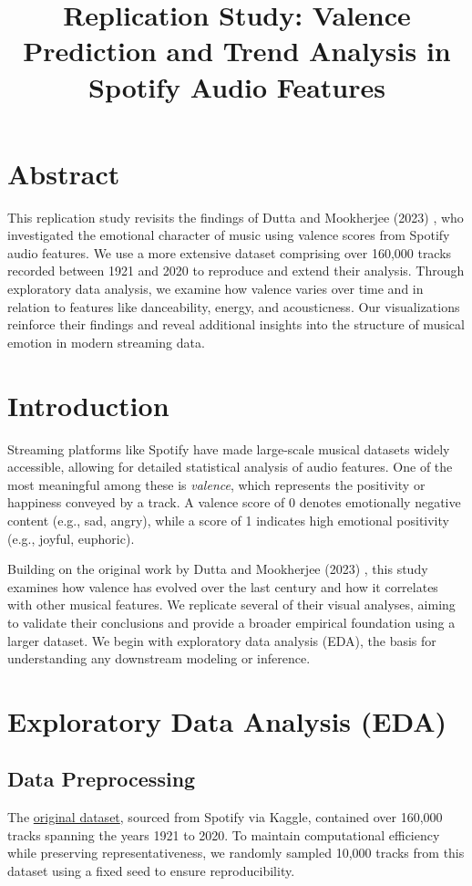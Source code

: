 \documentclass[a4paper,11pt]{article}
\title{Replication Study: Valence Prediction and Trend Analysis in Spotify Audio Features}
\author{}
\date{}
\begin{document}
\maketitle

\section*{Abstract}
This replication study revisits the findings of Dutta and Mookherjee (2023) \citep{dutta2023emotional}, who investigated the emotional character of music using valence scores from Spotify audio features. We use a more extensive dataset comprising over 160,000 tracks recorded between 1921 and 2020 to reproduce and extend their analysis. Through exploratory data analysis, we examine how valence varies over time and in relation to features like danceability, energy, and acousticness. Our visualizations reinforce their findings and reveal additional insights into the structure of musical emotion in modern streaming data.

\section{Introduction}
Streaming platforms like Spotify have made large-scale musical datasets widely accessible, allowing for detailed statistical analysis of audio features. One of the most meaningful among these is \textit{valence}, which represents the positivity or happiness conveyed by a track. A valence score of 0 denotes emotionally negative content (e.g., sad, angry), while a score of 1 indicates high emotional positivity (e.g., joyful, euphoric).

Building on the original work by Dutta and Mookherjee (2023) \citep{dutta2023emotional}, this study examines how valence has evolved over the last century and how it correlates with other musical features. We replicate several of their visual analyses, aiming to validate their conclusions and provide a broader empirical foundation using a larger dataset. We begin with exploratory data analysis (EDA), the basis for understanding any downstream modeling or inference.

\section{Exploratory Data Analysis (EDA)}

\subsection{Data Preprocessing}
The \href{https://www.kaggle.com/datasets/yamaerenay/spotify-dataset-1921-2020-160k-tracks}{original dataset}, sourced from Spotify via Kaggle, contained over 160,000 tracks spanning the years 1921 to 2020. To maintain computational efficiency while preserving representativeness, we randomly sampled 10,000 tracks from this dataset using a fixed seed to ensure reproducibility.
\end{document}
